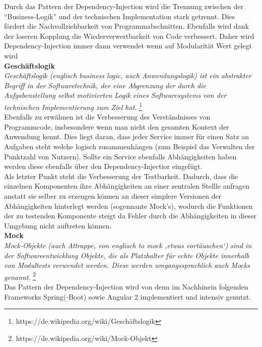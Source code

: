 Durch das Pattern der Dependency-Injection wird die Trennung zwischen der ``Business-Logik'' und der technischen Implementation stark getrennt. Dies fördert die Nachvollziehbarkeit von Programmabschnitten. Ebenfalls wird dank der loseren Kopplung die Wiederverwertbarkeit von Code verbessert. Daher wird Dependency-Injection immer dann verwendet wenn auf Modularität Wert gelegt wird \\


\textbf{Geschäftslogik} \\
\emph{\glqq   
Geschäftslogik (englisch business logic, auch Anwendungslogik) ist ein abstrakter Begriff in der Softwaretechnik, der eine Abgrenzung der durch die Aufgabenstellung selbst motivierten Logik eines Softwaresystems von der technischen Implementierung zum Ziel hat.
\grqq} \footnote{https://de.wikipedia.org/wiki/Geschäftslogik} \\

Ebenfalls zu erwähnen ist die Verbesserung des Verständnisses von Programmcode, insbesondere wenn man nicht den gesamten Kontext der Anwendung kennt. Dies liegt daran, dass jeder Service immer für einen Satz an Aufgaben steht welche logisch zusammenhängen (zum Beispiel das Verwalten der Punktzahl von Nutzern). Sollte ein Service ebenfalls Abhängigkeiten haben werden diese ebenfalls über den Dependency-Injectior eingefügt. \\

Als letzter Punkt steht die Verbesserung der Testbarkeit. Dadurch, dass die einzelnen Komponenten ihre Abhängigkeiten an einer zentralen Stellle anfragen anstatt sie selber zu erzeugen können an dieser simplere Versionen der Abhängigkeiten hinterlegt werden (sogennante Mock's), wodurch die Funktionen der zu testenden Komponente steigt da Fehler durch die Abhängigkeiten in dieser Umgebung nicht auftreten können. \\

\textbf{Mock} \\
\emph{\glqq   
Mock-Objekte (auch Attrappe, von englisch to mock ‚etwas vortäuschen‘) sind in der Softwareentwicklung Objekte, die als Platzhalter für echte Objekte innerhalb von Modultests verwendet werden. Diese werden umgangssprachlich auch Mocks genannt.
\grqq} \footnote{https://de.wikipedia.org/wiki/Mock-Objekt} \\

Das Pattern der Dependency-Injection wird von denn im Nachhinein folgenden Frameworks Spring(-Boot) sowie Angular 2 implementiert und intensiv genutzt.





